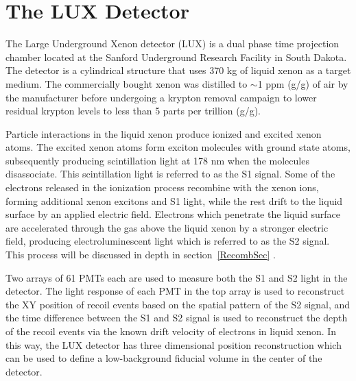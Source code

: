 \section{The LUX Detector} \label{LUXChap} %
The Large Underground Xenon detector (LUX) is a dual phase time projection chamber located at the Sanford Underground Research Facility in South Dakota.  The detector is a cylindrical structure that uses 370 kg of liquid xenon as a target medium.   The commercially bought xenon was distilled to $\sim$1 ppm (g/g) of air by the manufacturer before undergoing a krypton removal campaign to lower residual krypton levels to less than 5 parts per trillion (g/g). 

Particle interactions in the liquid xenon produce ionized and excited xenon atoms.    The excited xenon atoms form exciton molecules with ground state atoms, subsequently producing scintillation light at 178 nm when the molecules disassociate.  This scintillation light is referred to as the S1 signal.  Some of the electrons released in the ionization process recombine with the xenon ions, forming additional xenon excitons and S1 light, while the rest drift to the liquid surface by an applied electric field.   Electrons which penetrate the liquid surface are accelerated through the gas above the liquid xenon by a stronger electric field, producing electroluminescent light which is referred to as the S2 signal. This process will be discussed in depth in section~\ref{RecombSec} .

Two arrays of 61 PMTs each are used to measure both the S1 and S2 light in the detector.  The light response of each PMT in the top array is used to reconstruct the XY position of recoil events based on the spatial pattern of the S2 signal, and the time difference between the S1 and S2 signal is used to reconstruct the depth of the recoil events via the known drift velocity of electrons in liquid xenon.  In this way, the LUX detector has three dimensional position reconstruction which can be used to define a low-background fiducial volume in the center of the detector.  

